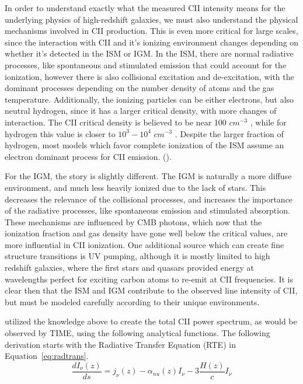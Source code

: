 \documentclass[manuscript]{aastex}
\begin{document}
In order to understand exactly what the measured CII intensity means for the underlying physics of high-redshift galaxies, we must also understand the physical mechanisms involved in CII production. This is even more critical for large scales, since the interaction with CII and it's ionizing environment changes depending on whether it's detected in the ISM or IGM. In the ISM, there are normal radiative processes, like spontaneous and stimulated emission that could account for the ionization, however there is also collisional excitation and de-excitation, with the dominant processes depending on the number density of atoms and the gas temperature. Additionally, the ionizing particles can be either electrons, but also neutral hydrogen, since it has a larger critical density, with more changes of interaction. The CII critical density is believed to be near 100 $cm ^{-3}$ , while for hydrogen this value is closer to $10^{3} - 10^{4}$  $cm^{-3}$ .  Despite the larger fraction of hydrogen, most models which favor complete ionization of the ISM assume an electron dominant process for CII emission. (\cite{Gong2012}). 

For the IGM, the story is slightly different. The IGM is naturally a more diffuse environment, and much less heavily ionized due to the lack of stars. This decreases the relevance of the collisional processes, and increases the importance of the radiative processes, like spontaneous emission and stimulated absorption. These mechanisms are influenced by CMB photons, which now that the ionization fraction and gas density have gone well below the critical values, are more influential in CII ionization. One additional source which can create fine structure transitions is UV pumping, although it is mostly limited to high redshift galaxies, where the first stars and quasars provided energy at wavelengths perfect for exciting carbon atoms to re-emit at CII frequencies. It is clear then that the ISM and IGM contribute to the observed line intensity of CII, but must be modeled carefully according to their unique environments. 

\cite{Gong2012} utilized the knowledge above to create the total CII power spectrum, as would be observed by TIME, using the following analytical functions. The following derivation starts with the Radiative Transfer Equation (RTE) in Equation~\ref{eq:radtrans}.
\begin{equation}\label{eq:radtrans}
\frac{dI_{\nu}(z)}{ds} = j_{\nu}(z) - \alpha_{nu}(z)I_{\nu} - 3 \frac{H(z)}{c}I_{\nu}
\end{equation}
\end{document}
